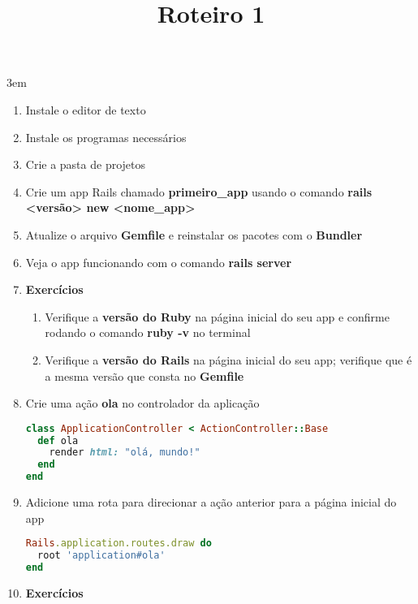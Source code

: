 \documentclass[a4paper,12pt]{article}
\title{Roteiro 1}
\begin{document}
\maketitle

\emergencystretch 3em

\setlength{\leftmargini}{0pt}
\begin{enumerate}
  \item Instale o editor de texto
  \item Instale os programas necessários
  \item Crie a pasta de projetos
  \item Crie um app Rails chamado \textbf{primeiro\_app} usando o comando \textbf{rails <versão> new <nome\_app>}
  \item Atualize o arquivo \textbf{Gemfile} e reinstalar os pacotes com o \textbf{Bundler}
  \item Veja o app funcionando com o comando \textbf{rails server}
  \item \textbf{Exercícios}

    \begin{enumerate}
      \item Verifique a \textbf{versão do Ruby} na página inicial do seu app e confirme rodando o comando \textbf{ruby -v} no terminal
      \item Verifique a \textbf{versão do Rails} na página inicial do seu app; verifique que é a mesma versão que consta no \textbf{Gemfile}
    \end{enumerate}

  \item Crie uma ação \textbf{ola} no controlador da aplicação

    \begin{lstlisting}[language=Ruby, title=app/controllers/application\_controller.rb]
class ApplicationController < ActionController::Base
  def ola
    render html: "olá, mundo!"
  end
end
    \end{lstlisting}

  \item Adicione uma rota para direcionar a ação anterior para a página inicial do app

    \begin{lstlisting}[language=Ruby, title=config/routes.rb]
Rails.application.routes.draw do
  root 'application#ola'
end
    \end{lstlisting}

  \item \textbf{Exercícios}


\end{enumerate}
\end{document}
